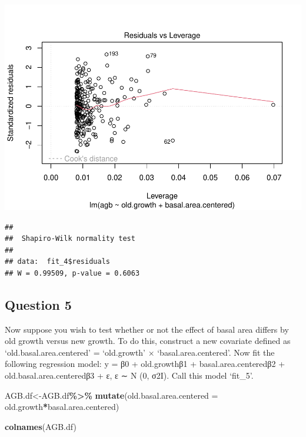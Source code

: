 \documentclass[
]{article}
\newenvironment{Shaded}{\begin{snugshade}}{\end{snugshade}}
\newcommand{\AttributeTok}[1]{\textcolor[rgb]{0.13,0.29,0.53}{#1}}
\newcommand{\FunctionTok}[1]{\textcolor[rgb]{0.13,0.29,0.53}{\textbf{#1}}}
\newcommand{\NormalTok}[1]{#1}
\newcommand{\OtherTok}[1]{\textcolor[rgb]{0.56,0.35,0.01}{#1}}
\newcommand{\SpecialCharTok}[1]{\textcolor[rgb]{0.81,0.36,0.00}{\textbf{#1}}}
\begin{document}
\includegraphics{Stats-Lab-7_files/figure-latex/unnamed-chunk-11-4.pdf}

\begin{Shaded}
\end{Shaded}

\begin{verbatim}
## 
##  Shapiro-Wilk normality test
## 
## data:  fit_4$residuals
## W = 0.99509, p-value = 0.6063
\end{verbatim}

\hypertarget{question-5}{%
\subsection{Question 5}\label{question-5}}

Now suppose you wish to test whether or not the effect of basal area
differs by old growth versus new growth. To do this, construct a new
covariate defined as `old.basal.area.centered' = `old.growth' ×
`basal.area.centered'. Now fit the following regression model: y = β0 +
old.growthβ1 + basal.area.centeredβ2 + old.basal.area.centeredβ3 + ε, ε
∼ N (0, σ2I). Call this model `fit\_5'.

\begin{Shaded}
\begin{Highlighting}[]
\NormalTok{AGB.df}\OtherTok{\textless{}{-}}\NormalTok{AGB.df}\SpecialCharTok{\%\textgreater{}\%}
  \FunctionTok{mutate}\NormalTok{(}\AttributeTok{old.basal.area.centered =}\NormalTok{ old.growth}\SpecialCharTok{*}\NormalTok{basal.area.centered)}

\FunctionTok{colnames}\NormalTok{(AGB.df)}
\end{Highlighting}
\end{Shaded}
\end{document}
